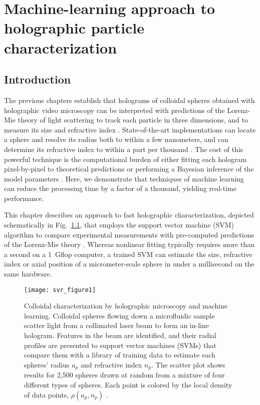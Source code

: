 \chapter{Machine-learning approach to holographic particle characterization}
\label{ch:svr}

\section{Introduction}

The previous chapters establish that holograms of colloidal spheres obtained 
with holographic video microscopy
\cite{sheng06,lee07}
can be interpreted with predictions of the Lorenz-Mie theory 
of light scattering \cite{bohren83}
to track each particle in three dimensions, and to measure 
its size and refractive index \cite{lee07a}.
State-of-the-art implementations \cite{lee07a,bourquard13,seifi13,fung13}
can locate a sphere and resolve its
radius both to within a few nanometers, and 
can determine its refractive index to within a part per thousand
\cite{cheong09,shpaisman12,krishnatreya14}.
The cost of this powerful technique is the computational burden of
either fitting each hologram pixel-by-pixel to theoretical predictions
\cite{lee07a,cheong10a} or performing a Bayesian inference of the
model parameters \cite{dimiduk16}.
Here, we demonstrate that techniques of machine learning
can reduce the processing time by a factor of a thousand,
yielding real-time performance.

This chapter describes an approach to fast holographic characterization,
depicted schematically in Fig.~\ref{fig:method}, that
employs the support vector machine (SVM) algorithm
\cite{smola04} 
to compare experimental measurements with
pre-computed predictions of the Lorenz-Mie theory
\cite{bohren83,lee07a,krishnatreya14a}.
Whereas nonlinear fitting typically requires more than a second
on a \SI{1}{\giga flop} computer,
a trained SVM can estimate the size, refractive index or
axial position of a micrometer-scale sphere
in under a millisecond on the same hardware.

\begin{figure}
  \centering
  \texttt{[image: svr\_figure1]}
  \caption{Colloidal characterization by holographic microscopy and
    machine learning.  Colloidal spheres flowing down a microfluidic
    sample scatter light from a collimated laser beam to form an
    in-line hologram.  Features in the beam are identified, and their
    radial profiles are presented to support vector machines (SVMs)
    that compare them with a library of training data to estimate
    each spheres' radius $a_p$ and refractive index
    $n_p$.  The scatter plot shows results for 2,500 spheres
    drawn at random from a mixture of four different types of
    spheres.  Each point is colored by the local density of
    data points, $\rho(a_p,n_p)$ \cite{yevick14}.}
  \label{fig:method}
\end{figure}

